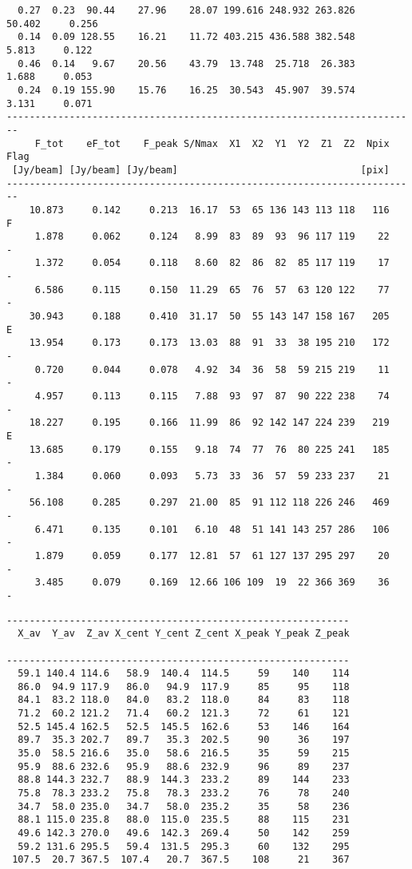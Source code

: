 {\begin{verbatim}
  0.27  0.23  90.44    27.96    28.07 199.616 248.932 263.826    50.402     0.256
  0.14  0.09 128.55    16.21    11.72 403.215 436.588 382.548     5.813     0.122
  0.46  0.14   9.67    20.56    43.79  13.748  25.718  26.383     1.688     0.053
  0.24  0.19 155.90    15.76    16.25  30.543  45.907  39.574     3.131     0.071
------------------------------------------------------------------------
     F_tot    eF_tot    F_peak S/Nmax  X1  X2  Y1  Y2  Z1  Z2  Npix Flag
 [Jy/beam] [Jy/beam] [Jy/beam]                                [pix]     
------------------------------------------------------------------------
    10.873     0.142     0.213  16.17  53  65 136 143 113 118   116    F
     1.878     0.062     0.124   8.99  83  89  93  96 117 119    22    -
     1.372     0.054     0.118   8.60  82  86  82  85 117 119    17    -
     6.586     0.115     0.150  11.29  65  76  57  63 120 122    77    -
    30.943     0.188     0.410  31.17  50  55 143 147 158 167   205    E
    13.954     0.173     0.173  13.03  88  91  33  38 195 210   172    -
     0.720     0.044     0.078   4.92  34  36  58  59 215 219    11    -
     4.957     0.113     0.115   7.88  93  97  87  90 222 238    74    -
    18.227     0.195     0.166  11.99  86  92 142 147 224 239   219    E
    13.685     0.179     0.155   9.18  74  77  76  80 225 241   185    -
     1.384     0.060     0.093   5.73  33  36  57  59 233 237    21    -
    56.108     0.285     0.297  21.00  85  91 112 118 226 246   469    -
     6.471     0.135     0.101   6.10  48  51 141 143 257 286   106    -
     1.879     0.059     0.177  12.81  57  61 127 137 295 297    20    -
     3.485     0.079     0.169  12.66 106 109  19  22 366 369    36    -
\end{verbatim}
\newpage
\begin{verbatim}
------------------------------------------------------------
  X_av  Y_av  Z_av X_cent Y_cent Z_cent X_peak Y_peak Z_peak
                                                            
------------------------------------------------------------
  59.1 140.4 114.6   58.9  140.4  114.5     59    140    114
  86.0  94.9 117.9   86.0   94.9  117.9     85     95    118
  84.1  83.2 118.0   84.0   83.2  118.0     84     83    118
  71.2  60.2 121.2   71.4   60.2  121.3     72     61    121
  52.5 145.4 162.5   52.5  145.5  162.6     53    146    164
  89.7  35.3 202.7   89.7   35.3  202.5     90     36    197
  35.0  58.5 216.6   35.0   58.6  216.5     35     59    215
  95.9  88.6 232.6   95.9   88.6  232.9     96     89    237
  88.8 144.3 232.7   88.9  144.3  233.2     89    144    233
  75.8  78.3 233.2   75.8   78.3  233.2     76     78    240
  34.7  58.0 235.0   34.7   58.0  235.2     35     58    236
  88.1 115.0 235.8   88.0  115.0  235.5     88    115    231
  49.6 142.3 270.0   49.6  142.3  269.4     50    142    259
  59.2 131.6 295.5   59.4  131.5  295.3     60    132    295
 107.5  20.7 367.5  107.4   20.7  367.5    108     21    367
\end{verbatim}
}

